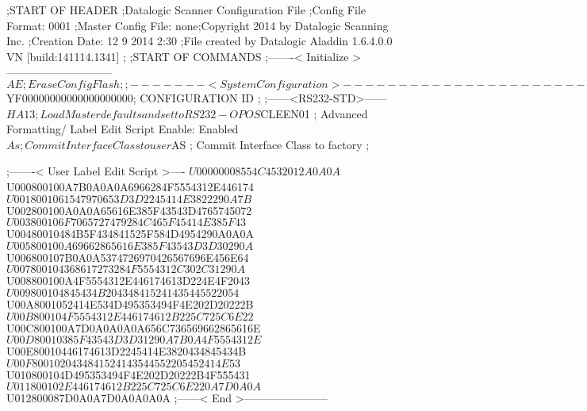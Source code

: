 ;START OF HEADER
;Datalogic Scanner Configuration File
;Config File Format: 0001
;Master Config File: none;Copyright 2014 by Datalogic Scanning Inc.
;Creation Date: 12 9 2014 2:30
;File created by Datalogic Aladdin 1.6.4.0.0 VN [build:141114.1341]
;
;START OF COMMANDS
;-------< Initialize >-----------------------------
$AE                 ; Erase Config Flash
;
;-------< System Configuration >-------------------------------
$YF00000000000000000000; CONFIGURATION ID
;
;------<RS232-STD>------
$HA13               ; Load Master defaults and set to RS232-OPOS
$CLEEN01            ; Advanced Formatting/ Label Edit Script Enable: Enabled
$As                 ; Commit Interface Class to user
$AS                 ; Commit Interface Class to factory
;

;-------< User Label Edit Script >----
$U00000008554C4532012A0A0A
$U000800100A7B0A0A0A6966284F5554312E446174
$U0018001061547970653D3D2245414E3822290A7B
$U002800100A0A0A65616E385F43543D4765745072
$U003800106F7065727479284C465F45414E385F43
$U00480010484B5F434841525F584D4954290A0A0A
$U005800100A69662865616E385F43543D3D30290A
$U006800107B0A0A5374726970426567696E456E64
$U007800104368617273284F5554312C302C31290A
$U008800100A4F5554312E446174613D224E4F2043
$U009800104845434B204348415241435445522054
$U00A8001052414E534D495353494F4E202D20222B
$U00B800104F5554312E446174612B225C725C6E22
$U00C800100A7D0A0A0A0A656C736569662865616E
$U00D80010385F43543D3D31290A7B0A4F5554312E
$U00E80010446174613D2245414E3820434845434B
$U00F8001020434841524143544552205452414E53
$U010800104D495353494F4E202D20222B4F555431
$U011800102E446174612B225C725C6E220A7D0A0A
$U012800087D0A0A7D0A0A0A0A
;------< End >-----------------------
